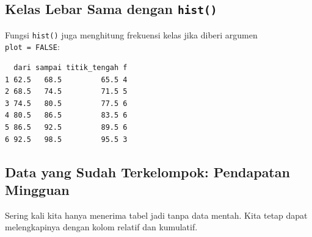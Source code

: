 \documentclass[
  indonesian,
  letterpaper,
]{book}
\newenvironment{Shaded}{\begin{snugshade}}{\end{snugshade}}
\newcommand{\AttributeTok}[1]{\textcolor[rgb]{0.40,0.45,0.13}{#1}}
\newcommand{\ConstantTok}[1]{\textcolor[rgb]{0.56,0.35,0.01}{#1}}
\newcommand{\DecValTok}[1]{\textcolor[rgb]{0.68,0.00,0.00}{#1}}
\newcommand{\FunctionTok}[1]{\textcolor[rgb]{0.28,0.35,0.67}{#1}}
\newcommand{\NormalTok}[1]{\textcolor[rgb]{0.00,0.23,0.31}{#1}}
\newcommand{\OtherTok}[1]{\textcolor[rgb]{0.00,0.23,0.31}{#1}}
\newcommand{\SpecialCharTok}[1]{\textcolor[rgb]{0.37,0.37,0.37}{#1}}
\begin{document}
\subsection{\texorpdfstring{Kelas Lebar Sama dengan
\texttt{hist()}}{Kelas Lebar Sama dengan hist()}}\label{kelas-lebar-sama-dengan-hist}

Fungsi \texttt{hist()} juga menghitung frekuensi kelas jika diberi
argumen \texttt{plot\ =\ FALSE}:

\begin{Shaded}
\end{Shaded}

\begin{verbatim}
  dari sampai titik_tengah f
1 62.5   68.5         65.5 4
2 68.5   74.5         71.5 5
3 74.5   80.5         77.5 6
4 80.5   86.5         83.5 6
5 86.5   92.5         89.5 6
6 92.5   98.5         95.5 3
\end{verbatim}

\subsection{Data yang Sudah Terkelompok: Pendapatan
Mingguan}\label{data-yang-sudah-terkelompok-pendapatan-mingguan}

Sering kali kita hanya menerima tabel jadi tanpa data mentah. Kita tetap
dapat melengkapinya dengan kolom relatif dan kumulatif.
\end{document}

